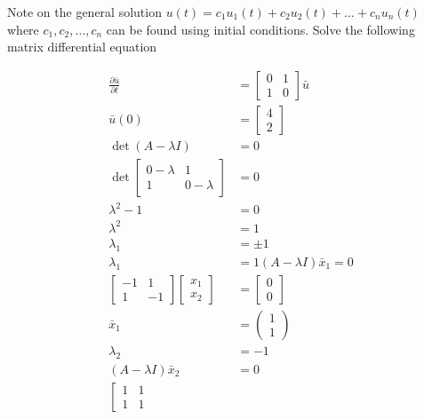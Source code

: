 \documentclass[main.tex]{subfiles}
\begin{document}
    Note on the general solution $u(t)=c_{1}u_{1}(t) + c_{2}u_{2}(t) + \ldots + c_{n} u_{n}(t)$ where $c_{1}, c_{2}, \ldots, c_{n}$ can be found using initial conditions. Solve the following matrix differential equation

    $$
    \begin{aligned}  
    \frac{\partial \bar{u}}{\partial t} &= \left[\begin{array}{ll}
    0 & 1 \\
    1 & 0
    \end{array}\right] \bar{u} \\
    \bar{u}(0) &= \left[\begin{array}{l}
    4 \\
    2
    \end{array}\right]\\
    \operatorname{det}(A-\lambda I)&=0\\
    \operatorname{det}\left[\begin{array}{cc}
    0-\lambda & 1 \\
    1 & 0-\lambda
    \end{array}\right]&=0\\
    \lambda^{2}-1&=0\\
    \lambda^{2} &=1\\
    \lambda_{1} &=\pm 1\\
    \lambda_{1} &=1 (A-\lambda I) \bar{x}_{1} =0\\
    \left[\begin{array}{cc}
    -1 & 1 \\
    1 & -1
    \end{array}\right]\left[\begin{array}{l}
    x_{1} \\
    x_{2}
    \end{array}\right]&=\left[\begin{array}{l}
    0 \\
    0
    \end{array}\right]\\
    \bar{x}_{1}&=\left(\begin{array}{l}
    1 \\
    1
    \end{array}\right)\\
    \lambda_{2}&=-1\\
    (A-\lambda I) \bar{x}_{2}&=0\\
    \left[\begin{array}{ll}
    1 & 1 \\
    1 & 1

\end{array}
\end{aligned}$$
\end{document}
